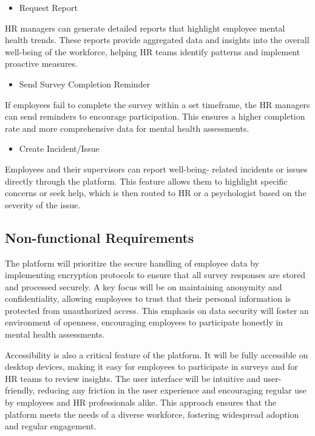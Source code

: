 \documentclass[conference]{IEEEtran}
\begin{document}
 \begin{itemize}
     \item Request Report
     \end{itemize}
            
     HR managers can generate detailed reports that highlight
     employee mental health trends. These reports provide
     aggregated data and insights into the overall well-being of the
     workforce, helping HR teams identify patterns and implement
     proactive measures.
\newline

\begin{itemize}
    \item Send Survey Completion Reminder
    \end{itemize}
           
    If employees fail to complete the survey within a set
timeframe, the HR managers can send reminders to encourage
participation. This ensures a higher completion rate and more
comprehensive data for mental health assessments.
\newline

\begin{itemize}
    \item Create Incident/Issue
    \end{itemize}
           
    Employees and their supervisors can report well-being-
related incidents or issues directly through the platform. This
feature allows them to highlight specific concerns or seek
help, which is then routed to HR or a psychologist based on
the severity of the issue.



\subsection{Non-functional Requirements}\label{AA}
The platform will prioritize the secure handling of
employee data by implementing encryption protocols to
ensure that all survey responses are stored and processed
securely. A key focus will be on maintaining anonymity and
confidentiality, allowing employees to trust that their personal
information is protected from unauthorized access. This
emphasis on data security will foster an environment of
openness, encouraging employees to participate honestly in
mental health assessments.\newline

Accessibility is also a critical feature of the platform. It
will be fully accessible on desktop devices, making it easy for
employees to participate in surveys and for HR teams to
review insights. The user interface will be intuitive and user-
friendly, reducing any friction in the user experience and
encouraging regular use by employees and HR professionals
alike. This approach ensures that the platform meets the needs
of a diverse workforce, fostering widespread adoption and
regular engagement.
\end{document}
